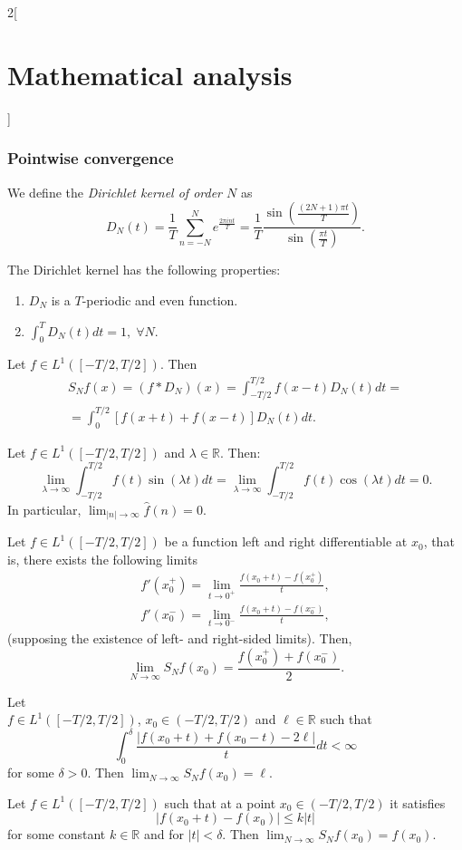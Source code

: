 \documentclass[class=article,crop=false]{standalone}
\begin{document}
\begin{multicols}{2}[\section{Mathematical analysis}]
\subsubsection*{Pointwise convergence}
\begin{definition}
We define the \textit{Dirichlet kernel of order $N$} as $$D_N(t)=\frac{1}{T}\sum_{n=-N}^Ne^{\frac{2\pi int}{T}}=\frac{1}{T}\frac{\sin\left(\frac{(2N+1)\pi t}{T}\right)}{\sin\left(\frac{\pi t}{T}\right)}.$$
\end{definition}
\begin{prop}
The Dirichlet kernel has the following properties:
\begin{enumerate}
    \item $D_N$ is a $T$-periodic and even function.
    \item $\displaystyle\int_0^TD_N(t)dt=1,\;\forall N$.
\end{enumerate}
\end{prop}
\begin{prop}
Let $f\in L^1([-T/2,T/2])$. Then 
\begin{multline*}
    S_Nf(x)=(f*D_N)(x)=\int_{-T/2}^{T/2}f(x-t)D_N(t)dt=\\=\int_0^{T/2}[f(x+t)+f(x-t)]D_N(t)dt.
\end{multline*}
\end{prop}
\begin{lemma}
Let $f\in L^1([-T/2,T/2])$ and $\lambda\in\mathbb{R}$. Then: $$\lim_{\lambda\to\infty}\int_{-T/2}^{T/2}f(t)\sin(\lambda t)dt=\lim_{\lambda\to\infty}\int_{-T/2}^{T/2}f(t)\cos(\lambda t)dt=0.$$ In particular, $\displaystyle\lim_{|n|\to\infty}\widehat{f}(n)=0$.
\end{lemma}
\begin{theorem}
Let $f\in L^1([-T/2,T/2])$ be a function left and right differentiable at $x_0$, that is, there exists the following limits
\begin{gather*}f'(x_0^+)=\lim_{t\to0^+}\frac{f(x_0+t)-f(x_0^+)}{t},\\ f'(x_0^-)=\lim_{t\to0^-}\frac{f(x_0+t)-f(x_0^-)}{t},\end{gather*}(supposing the existence of left- and right-sided limits). Then, $$\lim_{N\to\infty}S_Nf(x_0)=\frac{f(x_0^+)+f(x_0^-)}{2}.$$
\end{theorem}
\begin{theorem}
Let \\$f\in L^1([-T/2,T/2])$, $x_0\in (-T/2,T/2)$ and $\ell\in\mathbb{R}$ such that $$\int_0^\delta\frac{|f(x_0+t)+f(x_0-t)-2\ell|}{t}dt<\infty$$ for some $\delta>0$. Then $\displaystyle\lim_{N\to\infty}S_Nf(x_0)=\ell$.
\end{theorem}
\begin{theorem}
Let $f\in L^1([-T/2,T/2])$ such that at a point $x_0\in (-T/2,T/2)$ it satisfies $$|f(x_0+t)-f(x_0)|\leq k|t|$$ for some constant $k\in\mathbb{R}$ and for $|t|<\delta$. Then $\displaystyle\lim_{N\to\infty}S_Nf(x_0)=f(x_0)$.
\end{theorem}

\end{multicols}
\end{document}
